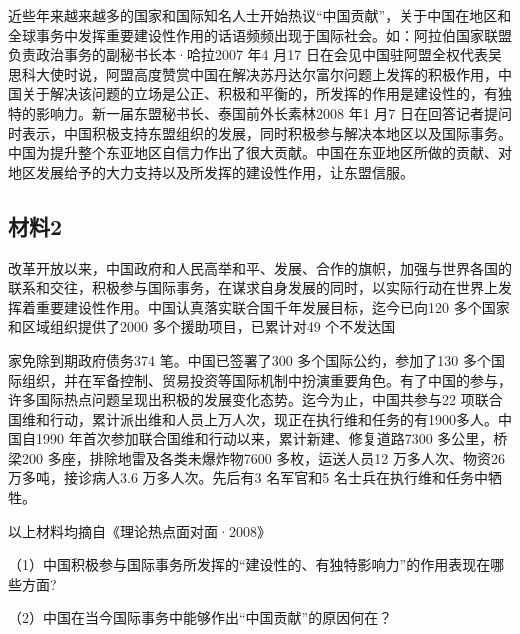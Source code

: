 \documentclass[UTF8,11pt]{ctexart}
\begin{document}
近些年来越来越多的国家和国际知名人士开始热议“中国贡献”，关于中国在地区和全球事务中发挥重要建设性作用的话语频频出现于国际社会。如：阿拉伯国家联盟负责政治事务的副秘书长本·哈拉2007 年4 月17 日在会见中国驻阿盟全权代表吴思科大使时说，阿盟高度赞赏中国在解决苏丹达尔富尔问题上发挥的积极作用，中国关于解决该问题的立场是公正、积极和平衡的，所发挥的作用是建设性的，有独特的影响力。新一届东盟秘书长、泰国前外长素林2008 年1 月7 日在回答记者提问时表示，中国积极支持东盟组织的发展，同时积极参与解决本地区以及国际事务。中国为提升整个东亚地区自信力作出了很大贡献。中国在东亚地区所做的贡献、对地区发展给予的大力支持以及所发挥的建设性作用，让东盟信服。


\subsection*{材料2}

改革开放以来，中国政府和人民高举和平、发展、合作的旗帜，加强与世界各国的联系和交往，积极参与国际事务，在谋求自身发展的同时，以实际行动在世界上发挥着重要建设性作用。中国认真落实联合国千年发展目标，迄今已向120 多个国家和区域组织提供了2000 多个援助项目，已累计对49 个不发达国


家免除到期政府债务374 笔。中国已签署了300 多个国际公约，参加了130 多个国际组织，并在军备控制、贸易投资等国际机制中扮演重要角色。有了中国的参与，许多国际热点问题呈现出积极的发展变化态势。迄今为止，中国共参与22 项联合国维和行动，累计派出维和人员上万人次，现正在执行维和任务的有1900多人。中国自1990 年首次参加联合国维和行动以来，累计新建、修复道路7300 多公里，桥梁200 多座，排除地雷及各类未爆炸物7600 多枚，运送人员12 万多人次、物资26 万多吨，接诊病人3.6 万多人次。先后有3 名军官和5 名士兵在执行维和任务中牺牲。

以上材料均摘自《理论热点面对面·2008》

（1）中国积极参与国际事务所发挥的“建设性的、有独特影响力”的作用表现在哪些方面?


（2）中国在当今国际事务中能够作出“中国贡献”的原因何在？
\end{document}
